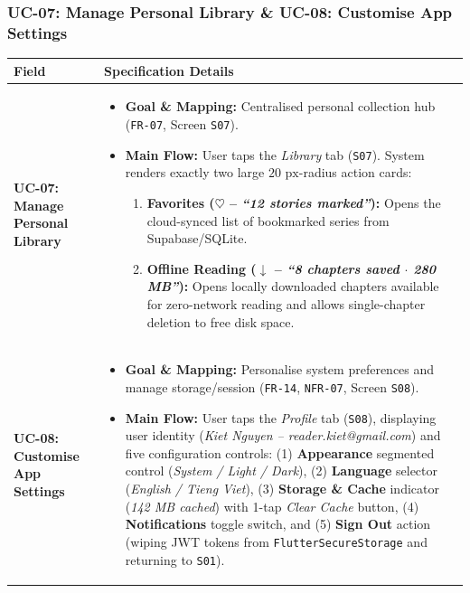 \subsubsection{UC-07: Manage Personal Library \& UC-08: Customise App Settings}
\begin{table}[H]
\footnotesize
\renewcommand{\arraystretch}{1.22}
\begin{tabularx}{\textwidth}{L{3.2cm} Y}
\toprule
{}
\textbf{Field} & \textbf{Specification Details} \\
\midrule
\textbf{UC-07: Manage Personal Library} &
\begin{itemize}[nosep,leftmargin=1.4em]
    \item \textbf{Goal \& Mapping:} Centralised personal collection hub (\texttt{FR-07}, Screen \texttt{S07}).
    \item \textbf{Main Flow:} User taps the \textit{Library} tab (\texttt{S07}). System renders exactly two large $20\text{ px}$-radius action cards:
    \begin{enumerate}[nosep]
        \item \textbf{Favorites ($\heartsuit$ -- \textit{``12 stories marked''}):} Opens the cloud-synced list of bookmarked series from Supabase/SQLite.
        \item \textbf{Offline Reading ($\downarrow$ -- \textit{``8 chapters saved $\cdot$ 280 MB''}):} Opens locally downloaded chapters available for zero-network reading and allows single-chapter deletion to free disk space.
    \end{enumerate}
\end{itemize} \\
\midrule
\textbf{UC-08: Customise App Settings} &
\begin{itemize}[nosep,leftmargin=1.4em]
    \item \textbf{Goal \& Mapping:} Personalise system preferences and manage storage/session (\texttt{FR-14}, \texttt{NFR-07}, Screen \texttt{S08}).
    \item \textbf{Main Flow:} User taps the \textit{Profile} tab (\texttt{S08}), displaying user identity (\textit{Kiet Nguyen -- reader.kiet@gmail.com}) and five configuration controls: (1) \textbf{Appearance} segmented control (\textit{System / Light / Dark}), (2) \textbf{Language} selector (\textit{English / Tieng Viet}), (3) \textbf{Storage \& Cache} indicator (\textit{142 MB cached}) with 1-tap \textit{Clear Cache} button, (4) \textbf{Notifications} toggle switch, and (5) \textbf{Sign Out} action (wiping JWT tokens from \texttt{FlutterSecureStorage} and returning to \texttt{S01}).
\end{itemize} \\
\bottomrule
\end{tabularx}
\end{table}

